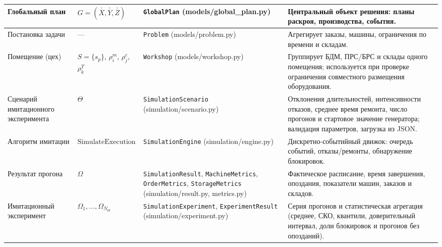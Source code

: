 \begin{longtable}{|p{3.4cm}|p{3.2cm}|p{4.2cm}|p{4.2cm}|}
    \hline
    Глобальный план & $G=(\overline{\overline{X}},\overline{\overline{Y}},\overline{\overline{Z}})$ & \texttt{GlobalPlan} (models/global\_plan.py) & Центральный объект решения: планы раскроя, производства, события.\\
    \hline
    Постановка задачи & --- & \texttt{Problem} (models/problem.py) & Агрегирует заказы, машины, ограничения по времени и складам.\\
    \hline
    Помещение (цех) & $S=\{s_p\}$, $\rho^m_i$, $\rho^c_j$, $\rho^T_k$ & \texttt{Workshop} (models/workshop.py) & Группирует БДМ, ПРС/БРС и склады одного помещения; используется при проверке ограничения совместного размещения оборудования.\\
    \hline
    Сценарий имитационного эксперимента & $\Theta$ & \texttt{SimulationScenario} (simulation/scenario.py) & Отклонения длительностей, интенсивности отказов, среднее время ремонта, число прогонов и стартовое значение генератора; валидация параметров, загрузка из JSON.\\
    \hline
    Алгоритм имитации & $\mathrm{SimulateExecution}$ & \texttt{SimulationEngine} (simulation/engine.py) & Дискретно-событийный движок: очередь событий, отказы/ремонты, обнаружение блокировок.\\
    \hline
    Результат прогона & $\Omega$ & \texttt{SimulationResult}, \texttt{MachineMetrics}, \texttt{OrderMetrics}, \texttt{StorageMetrics} (simulation/result.py, metrics.py) & Фактическое расписание, время завершения, опоздания, показатели машин, заказов и складов.\\
    \hline
    Имитационный эксперимент & $\Omega_1,\ldots,\Omega_{N_{\Theta}}$ & \texttt{SimulationExperiment}, \texttt{ExperimentResult} (simulation/experiment.py) & Серия прогонов и статистическая агрегация (среднее, СКО, квантили, доверительный интервал, доли блокировок и прогонов без опозданий).\\
    \hline
\end{longtable}


